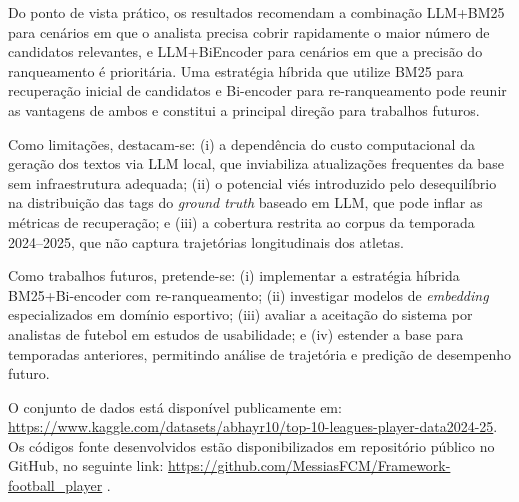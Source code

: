 \documentclass[portuguese]{sbc2025}
\begin{document}
Do ponto de vista prático, os resultados recomendam a combinação LLM+BM25 para
cenários em que o analista precisa cobrir rapidamente o maior número de candidatos
relevantes, e LLM+BiEncoder para cenários em que a precisão do ranqueamento é
prioritária. Uma estratégia híbrida que utilize BM25 para recuperação inicial de
candidatos e Bi-encoder para re-ranqueamento pode reunir as vantagens de ambos e
constitui a principal direção para trabalhos futuros.

Como limitações, destacam-se: (i) a dependência do custo computacional da geração
dos textos via LLM local, que inviabiliza atualizações frequentes da base sem
infraestrutura adequada; (ii) o potencial viés introduzido pelo desequilíbrio na
distribuição das tags do \textit{ground truth} baseado em LLM, que pode inflar as
métricas de recuperação; e (iii) a cobertura restrita ao corpus da temporada
2024--2025, que não captura trajetórias longitudinais dos atletas.

Como trabalhos futuros, pretende-se: (i) implementar a estratégia híbrida
BM25+Bi-encoder com re-ranqueamento; (ii) investigar modelos de \textit{embedding}
especializados em domínio esportivo; (iii) avaliar a aceitação do sistema por
analistas de futebol em estudos de usabilidade; e (iv) estender a base para temporadas
anteriores, permitindo análise de trajetória e predição de desempenho futuro.

\begin{declarations}

\begin{materials}
O conjunto de dados está disponível publicamente em:
\url{https://www.kaggle.com/datasets/abhayr10/top-10-leagues-player-data2024-25}.
Os códigos fonte desenvolvidos estão disponibilizados em repositório público no GitHub,
no seguinte link:
\url{https://github.com/MessiasFCM/Framework-football_player} .
\end{materials}

\end{declarations}



\end{document}
